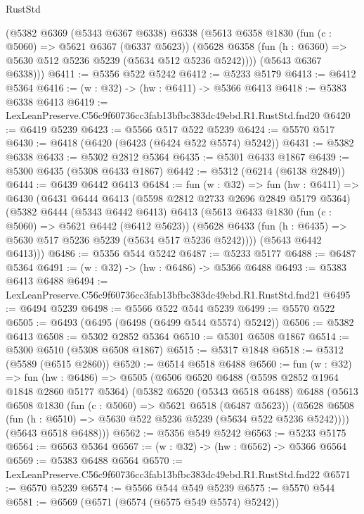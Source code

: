 \begin{lexlean}{RustStd}
\begin{coremodule}
      (@5382
        @6369
        (@5343 @6367 @6338)
        @6338
        (@5613
          @6358
          @1830
          (fun (c : @5060) => @5621 @6367 (@6337 @5623))
          (@5628 @6358 (fun (h : @6360) => @5630 @512 @5236 @5239 (@5634 @512 @5236 @5242))))
        (@5643 @6367 @6338)))
@6411 := @5356 @522 @5242
@6412 := @5233 @5179
@6413 := @6412 @5364
@6416 := (w : @32) -> (hw : @6411) -> @5366 @6413
@6418 := @5383 @6338 @6413
@6419 := LexLeanPreserve.C56c9f60736cc3fab13bfbc383dc49ebd.R1.RustStd.fnd20
@6420 := @6419 @5239
@6423 := @5566 @517 @522 @5239
@6424 := @5570 @517
@6430 := @6418 (@6420 (@6423 (@6424 @522 @5574) @5242))
@6431 := @5382 @6338
@6433 := @5302 @2812 @5364
@6435 := @5301 @6433 @1867
@6439 := @5300 @6435 (@5308 @6433 @1867)
@6442 := @5312 (@6214 (@6138 @2849))
@6444 := @6439 @6442 @6413
@6484 := fun (w : @32) =>
  fun (hw : @6411) =>
  @6430
    (@6431
      @6444
      @6413
      (@5598 @2812 @2733 @2696 @2849 @5179 @5364)
      (@5382
        @6444
        (@5343 @6442 @6413)
        @6413
        (@5613
          @6433
          @1830
          (fun (c : @5060) => @5621 @6442 (@6412 @5623))
          (@5628 @6433 (fun (h : @6435) => @5630 @517 @5236 @5239 (@5634 @517 @5236 @5242))))
        (@5643 @6442 @6413)))
@6486 := @5356 @544 @5242
@6487 := @5233 @5177
@6488 := @6487 @5364
@6491 := (w : @32) -> (hw : @6486) -> @5366 @6488
@6493 := @5383 @6413 @6488
@6494 := LexLeanPreserve.C56c9f60736cc3fab13bfbc383dc49ebd.R1.RustStd.fnd21
@6495 := @6494 @5239
@6498 := @5566 @522 @544 @5239
@6499 := @5570 @522
@6505 := @6493 (@6495 (@6498 (@6499 @544 @5574) @5242))
@6506 := @5382 @6413
@6508 := @5302 @2852 @5364
@6510 := @5301 @6508 @1867
@6514 := @5300 @6510 (@5308 @6508 @1867)
@6515 := @5317 @1848
@6518 := @5312 (@5589 (@6515 @2860))
@6520 := @6514 @6518 @6488
@6560 := fun (w : @32) =>
  fun (hw : @6486) =>
  @6505
    (@6506
      @6520
      @6488
      (@5598 @2852 @1964 @1848 @2860 @5177 @5364)
      (@5382
        @6520
        (@5343 @6518 @6488)
        @6488
        (@5613
          @6508
          @1830
          (fun (c : @5060) => @5621 @6518 (@6487 @5623))
          (@5628 @6508 (fun (h : @6510) => @5630 @522 @5236 @5239 (@5634 @522 @5236 @5242))))
        (@5643 @6518 @6488)))
@6562 := @5356 @549 @5242
@6563 := @5233 @5175
@6564 := @6563 @5364
@6567 := (w : @32) -> (hw : @6562) -> @5366 @6564
@6569 := @5383 @6488 @6564
@6570 := LexLeanPreserve.C56c9f60736cc3fab13bfbc383dc49ebd.R1.RustStd.fnd22
@6571 := @6570 @5239
@6574 := @5566 @544 @549 @5239
@6575 := @5570 @544
@6581 := @6569 (@6571 (@6574 (@6575 @549 @5574) @5242))

\end{coremodule}
\end{lexlean}
